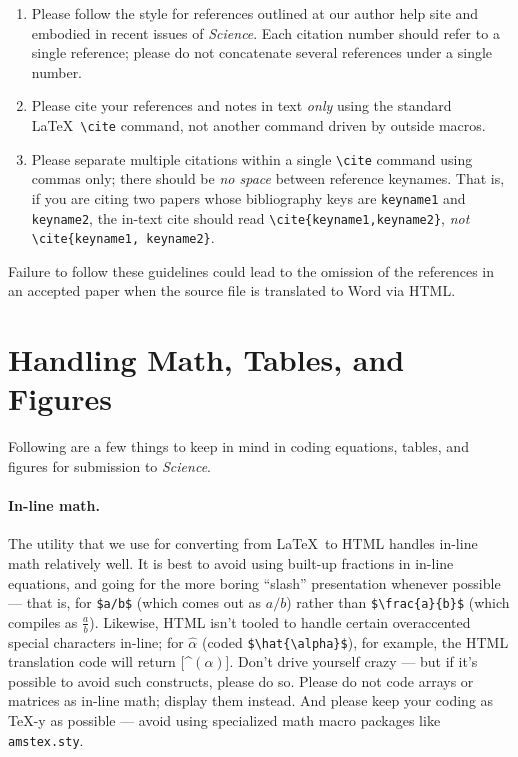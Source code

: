 \documentclass[12pt]{article}
\begin{document}
\begin{enumerate}
\item Please follow the style for references outlined at our author
help site and embodied in recent issues of {\it Science}.  Each
citation number should refer to a single reference; please do not
concatenate several references under a single number.
\item Please cite your references and notes in text {\it only\/} using
the standard \LaTeX\ \verb+\cite+ command, not another command
driven by outside macros.
\item Please separate multiple citations within a single \verb+\cite+
command using commas only; there should be {\it no space\/}
between reference keynames.  That is, if you are citing two
papers whose bibliography keys are \texttt{keyname1} and
\texttt{keyname2}, the in-text cite should read
\verb+\cite{keyname1,keyname2}+, {\it not\/}
\verb+\cite{keyname1, keyname2}+.
\end{enumerate}

\noindent Failure to follow these guidelines could lead
to the omission of the references in an accepted paper when the source
file is translated to Word via HTML.

\section*{Handling Math, Tables, and Figures}

Following are a few things to keep in mind in coding equations,
tables, and figures for submission to {\it Science}.

\paragraph*{In-line math.}  The utility that we use for converting
from \LaTeX\ to HTML handles in-line math relatively well.  It is best
to avoid using built-up fractions in in-line equations, and going for
the more boring ``slash'' presentation whenever possible --- that is,
for \verb+$a/b$+ (which comes out as $a/b$) rather than
\verb+$\frac{a}{b}$+ (which compiles as $\frac{a}{b}$).  Likewise,
HTML isn't tooled to handle certain overaccented special characters
in-line; for $\hat{\alpha}$ (coded \verb+$\hat{\alpha}$+), for
example, the HTML translation code will return [\^{}$(\alpha)$].
Don't drive yourself crazy --- but if it's possible to avoid such
constructs, please do so.  Please do not code arrays or matrices as
in-line math; display them instead.  And please keep your coding as
\TeX-y as possible --- avoid using specialized math macro packages
like \texttt{amstex.sty}.
\end{document}
